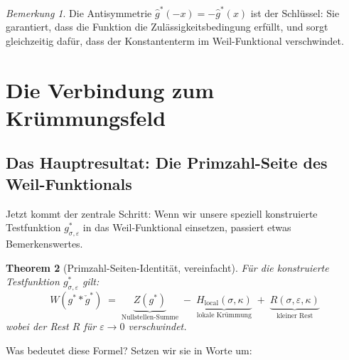 \documentclass[11pt,a4paper]{article}
\theoremstyle{plain}
\newtheorem{theorem}{Theorem}[section]
\theoremstyle{definition}
\theoremstyle{remark}
\newtheorem{remark}[theorem]{Bemerkung}
\newcommand{\Hlocal}{H_{\mathrm{local}}}
\begin{document}
	\begin{remark}
		Die Antisymmetrie $\hat{g}^*(-x) = -\hat{g}^*(x)$ ist der Schl\"ussel:
		Sie garantiert, dass die Funktion die Zul\"assigkeitsbedingung erf\"ullt,
		und sorgt gleichzeitig daf\"ur, dass der Konstantenterm im Weil-Funktional
		verschwindet.
	\end{remark}
	
	
	
	\section{Die Verbindung zum Kr\"ummungsfeld}\label{sec:verbindung}
	
	\subsection{Das Hauptresultat: Die Primzahl-Seite des Weil-Funktionals}
	
	Jetzt kommt der zentrale Schritt: Wenn wir unsere speziell konstruierte
	Testfunktion $g^*_{\sigma,\varepsilon}$ in das Weil-Funktional einsetzen,
	passiert etwas Bemerkenswertes.
	
	\begin{theorem}[Primzahl-Seiten-Identit\"at, vereinfacht]
		F\"ur die konstruierte Testfunktion $g^*_{\sigma,\varepsilon}$ gilt:
		\begin{equation}\label{eq:bridge}
			W(g^* * \check{g}^*)
			\;=\; \underbrace{Z(g^*)}_{\text{Nullstellen-Summe}}
			\;-\; \underbrace{\Hlocal(\sigma,\kappa)}_{\text{lokale Kr\"ummung}}
			\;+\; \underbrace{R(\sigma,\varepsilon,\kappa)}_{\text{kleiner Rest}}
		\end{equation}
		wobei der Rest $R$ f\"ur $\varepsilon \to 0$ verschwindet.
	\end{theorem}
	
	Was bedeutet diese Formel? Setzen wir sie in Worte um:
	
\end{document}
